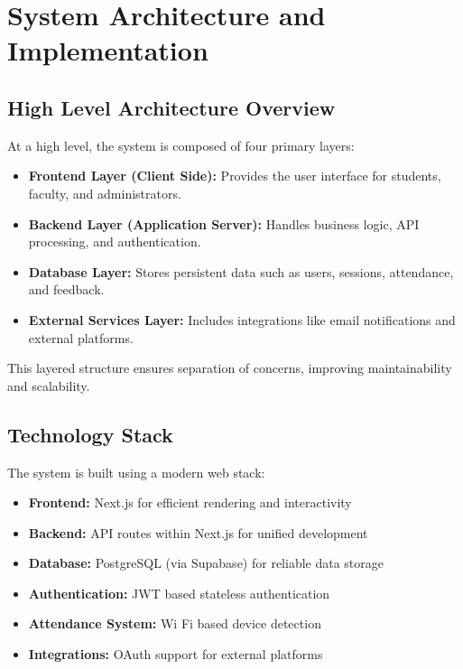 
\chapter{System Architecture and Implementation}{\label{ch:methodology}}

\section{High Level Architecture Overview}

At a high level, the system is composed of four primary layers:

\begin{itemize}
    \item \textbf{Frontend Layer (Client Side):} Provides the user interface for students, faculty, and
    administrators.
    \item \textbf{Backend Layer (Application Server):} Handles business logic, API processing, and
    authentication.
    \item \textbf{Database Layer:} Stores persistent data such as users, sessions, attendance, and
    feedback.
    \item \textbf{External Services Layer:} Includes integrations like email notifications and external
    platforms.
\end{itemize}

This layered structure ensures separation of concerns, improving maintainability and scalability.



\section{Technology Stack}

The system is built using a modern web stack:

\begin{itemize}
    \item \textbf{Frontend:} Next.js for efficient rendering and interactivity
    \item \textbf{Backend:} API routes within Next.js for unified development
    \item \textbf{Database:} PostgreSQL (via Supabase) for reliable data storage
    \item \textbf{Authentication:} JWT based stateless authentication
    \item \textbf{Attendance System:} Wi Fi based device detection
    \item \textbf{Integrations:} OAuth support for external platforms
\end{itemize}

